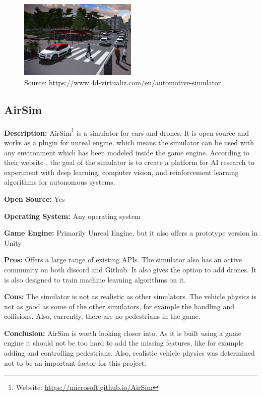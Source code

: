 \begin{figure}[H]
    \centering
    \includegraphics[width=0.5\textwidth]{Simulators/4DV-Sim.jpg}
    \caption{Source: \url{https://www.4d-virtualiz.com/en/automotive-simulator}}
\end{figure}

\subsection{AirSim}
\textbf{Description:} AirSim\footnote{Website: \url{https://microsoft.github.io/AirSim}} is a simulator for cars and drones. It is open-source and works as a plugin for unreal engine, which means the simulator can be used with any environment which has been modeled inside the game engine. According to their website \cite{AirSim_Website}, the goal of the simulator is to create a platform for AI research to experiment with deep learning, computer vision, and reinforcement learning algorithms for autonomous systems. 

\textbf{Open Source:} Yes

\textbf{Operating System:} Any operating system

\textbf{Game Engine:} Primarily Unreal Engine, but it also offers a prototype version in Unity

\textbf{Pros:} Offers a large range of existing APIs. The simulator also has an active community on both discord and Github. It also gives the option to add drones. It is also designed to train machine learning algorithms on it.

\textbf{Cons:} The simulator is not as realistic as other simulators. The vehicle physics is not as good as some of the other simulators, for example the handling and collisions. Also, currently, there are no pedestrians in the game. 

\textbf{Conclusion:} AirSim is worth looking closer into. As it is built using a game engine it should not be too hard to add the missing features, like for example adding and controlling pedestrians. Also, realistic vehicle physics was determined not to be an important factor for this project. 

